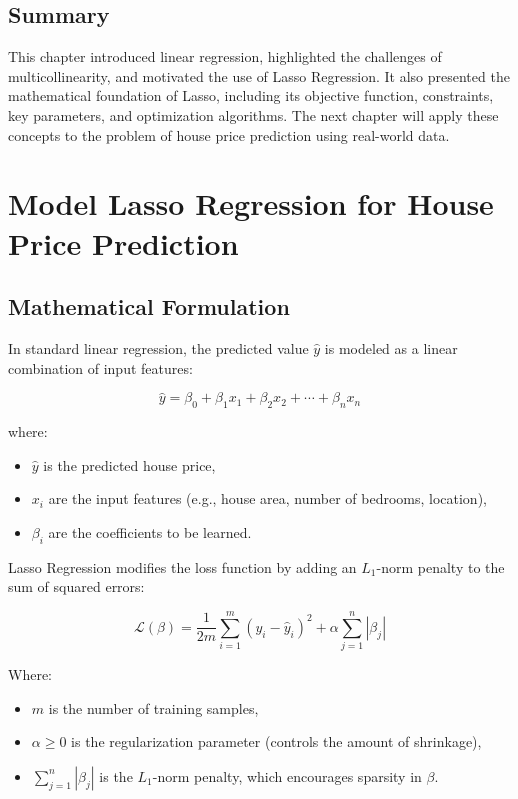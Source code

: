\documentclass[12pt, a4paper]{report}
\begin{document}
\section{ Summary}

This chapter introduced linear regression, highlighted the challenges of multicollinearity, and motivated the use of Lasso Regression. It also presented the mathematical foundation of Lasso, including its objective function, constraints, key parameters, and optimization algorithms. The next chapter will apply these concepts to the problem of house price prediction using real-world data.


\chapter{ Model Lasso Regression for House Price Prediction}
\section{Mathematical Formulation}

In standard linear regression, the predicted value \( \hat{y} \) is modeled as a linear combination of input features:

\[
\hat{y} = \beta_0 + \beta_1 x_1 + \beta_2 x_2 + \cdots + \beta_n x_n
\]

where:
\begin{itemize}
    \item \( \hat{y} \) is the predicted house price,
    \item \( x_i \) are the input features (e.g., house area, number of bedrooms, location),
    \item \( \beta_i \) are the coefficients to be learned.
\end{itemize}

Lasso Regression modifies the loss function by adding an \( L_1 \)-norm penalty to the sum of squared errors:

\[
\mathcal{L}(\beta) = \frac{1}{2m} \sum_{i=1}^{m} (y_i - \hat{y}_i)^2 + \alpha \sum_{j=1}^{n} |\beta_j|
\]

Where:
\begin{itemize}
    \item \( m \) is the number of training samples,
    \item \( \alpha \geq 0 \) is the regularization parameter (controls the amount of shrinkage),
    \item \( \sum_{j=1}^{n} |\beta_j| \) is the \( L_1 \)-norm penalty, which encourages sparsity in \( \beta \).
\end{itemize}
\end{document}
